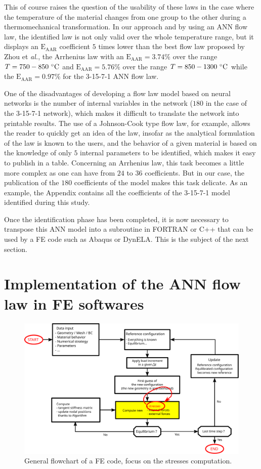 \documentclass[algorithms,article,submit,pdftex,moreauthors]{Definitions/mdpi}
\makeatletter
\DeclareRobustCommand{\eal}{et \emph{al.}\@\xspace}
\DeclareRobustCommand{\AARE}{\text{E}_\text{AAR}}
\makeatother
\begin{document}
This of course raises the question of the usability of these laws in the case where the temperature of the material changes from one group to the other during a thermomechanical transformation. 
In our approach and by using an ANN flow law, the identified law is not only valid over the whole temperature range, but it displays an $\AARE$ coefficient $5$ times lower than the best flow law proposed by Zhou \eal, the Arrhenius law with an $\AARE=3.74\%$ over the range $T=750-850~\celsius$ and $\AARE=5.76\%$ over the range $T=850-1300~\celsius$ while the $\AARE=0.97\%$ for the 3-15-7-1 ANN flow law.

One of the disadvantages of developing a flow law model based on neural networks is the number of internal variables in the network ($180$ in the case of the 3-15-7-1 network), which makes it difficult to translate the network into printable results. 
The use of a Johnson-Cook type flow law, for example, allows the reader to quickly get an idea of the law, insofar as the analytical formulation of the law is known to the users, and the behavior of a given material is based on the knowledge of only $5$ internal parameters to be identified, which makes it easy to publish in a table. 
Concerning an Arrhenius law, this task becomes a little more complex as one can have from $24$ to $36$ coefficients. 
But in our case, the publication of the $180$ coefficients of the model makes this task delicate. 
As an example, the Appendix contains all the coefficients of the 3-15-7-1 model identified during this study.

Once the identification phase has been completed, it is now necessary to transpose this ANN model into a subroutine in FORTRAN or C++ that can be used by a FE code such as Abaqus or DynELA. 
This is the subject of the next section.

\section{Implementation of the ANN flow law in FE softwares}\label{sec:Implementation}

\begin{figure}[!ht]
\centering
\includegraphics[width=0.9\columnwidth]{Figures/StressUpdate}
\caption{General flowchart of a FE code, focus on the stresses computation.}
\label{fig:StressUpdate}
\end{figure}
\end{document}
